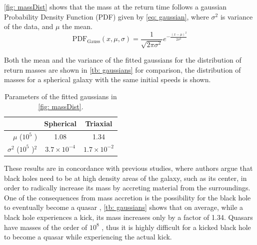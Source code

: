 	\autoref{fig: massDist} shows that the mass at the return time follows a gaussian Probability Density Function (PDF) given by \autoref{eq: gaussian}, where $\sigma^2$ is variance of the data, and $\mu$ the mean.
	\begin{equation}\label{eq: gaussian}
		\text{PDF}_\text{Gauss}(x, \mu, \sigma) = \dfrac{1}{\sqrt{2\pi\sigma^2}}e^{-\frac{(x - \mu)^2}{2\sigma^2}}
	\end{equation}
	
	Both the mean and the variance of the fitted gaussians for the distribution of return masses are shown in \autoref{tb: gaussians} for comparison, the distribution of masses for a spherical galaxy with the same initial speeds is shown.
	\begin{table}[h]
		\centering
		\caption{Parameters of the fitted gaussians in \autoref{fig: massDist}.}
		\begin{tabular}{r|cc}
			\hline
			& \textbf{Spherical} & \textbf{Triaxial} \\
			\hline
			$\mu$ ($10^5$ \sm)& 1.08 & 1.34 \\
			$\sigma^2$ ($10^5$ \sm)$^2$& $3.7\times10^{-4}$ & $1.7\times10^{-2}$\\
			\hline
		\end{tabular}
		\label{tb: gaussians}
	\end{table}

	These results are in concordance with previous studies, where authors argue that black holes need to be at high density areas of the galaxy, such as its center, in order to radically increase its mass by accreting material from the surroundings. One of the consequences from mass accretion is the possibility for the black hole to eventually become a quasar \cite{tanaka2009assembly}, \autoref{tb: gaussians} shows that on average, while a black hole experiences a kick, its mass increases only by a factor of 1.34. Quasars have masses of the order of $10^8$ \sm, thus it is highly difficult for a kicked black hole to become a quasar while experiencing the actual kick.
	
